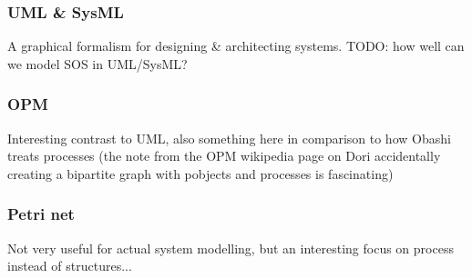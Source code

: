 \documentclass[12pt]{article}
\begin{document}
\subsubsection{UML \& SysML}  %

A graphical formalism for designing \& architecting systems. TODO: how well can
we model SOS in  UML/SysML?

\subsubsection{OPM}   

Interesting contrast to UML, also something here in
comparison to how Obashi treats processes (the note from                        
the OPM wikipedia page on Dori accidentally creating a                          
bipartite graph with pobjects and processes is fascinating)                     


\subsubsection{Petri net}

Not very useful for actual system modelling, but
an interesting focus on process instead of
structures...




\end{document}

